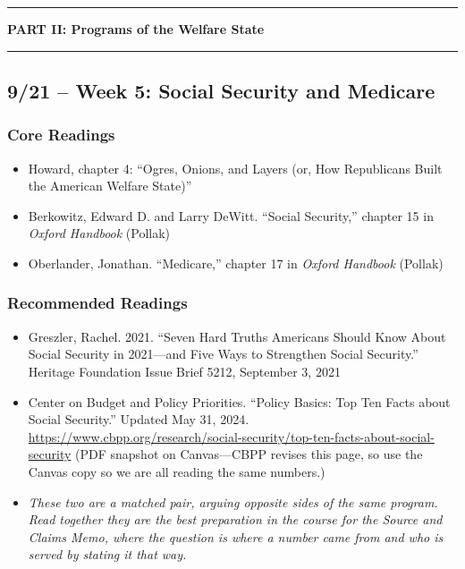 \documentclass[12pt]{article}
\begin{document}
\bigskip
\noindent\rule{\textwidth}{0.6pt}
\begin{center}\textbf{PART II: Programs of the Welfare State}\end{center}
\noindent\rule{\textwidth}{0.6pt}

\subsection*{9/21 -- Week 5: Social Security and Medicare}
    \subsubsection*{Core Readings}
        \begin{itemize}
            \item Howard, chapter 4: ``Ogres, Onions, and Layers (or, How Republicans Built the American Welfare State)''
            \item Berkowitz, Edward D. and Larry DeWitt. ``Social Security,'' chapter 15 in \emph{Oxford Handbook} (Pollak)
            \item Oberlander, Jonathan. ``Medicare,'' chapter 17 in \emph{Oxford Handbook} (Pollak)
        \end{itemize}
    \subsubsection*{Recommended Readings}
        \begin{itemize}
            \item Greszler, Rachel. 2021. ``Seven Hard Truths Americans Should Know About Social Security in 2021---and Five Ways to Strengthen Social Security.'' Heritage Foundation Issue Brief 5212, September 3, 2021
            \item Center on Budget and Policy Priorities. ``Policy Basics: Top Ten Facts about Social Security.'' Updated May 31, 2024. \url{https://www.cbpp.org/research/social-security/top-ten-facts-about-social-security} (PDF snapshot on Canvas---CBPP revises this page, so use the Canvas copy so we are all reading the same numbers.)
            \item[] \emph{These two are a matched pair, arguing opposite sides of the same program. Read together they are the best preparation in the course for the Source and Claims Memo, where the question is where a number came from and who is served by stating it that way.}
        \end{itemize}
\end{document}
